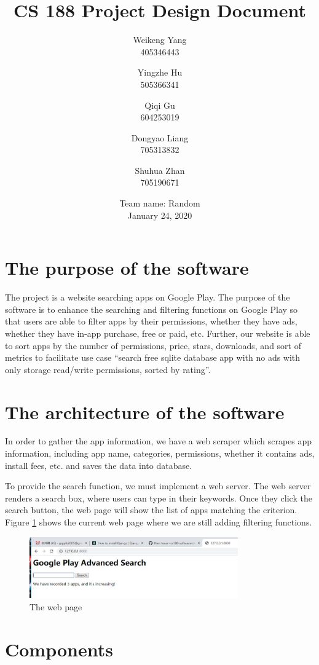 \documentclass[12pt, a4paper]{article}
\title{CS 188 Project Design Document}
\author{Weikeng Yang\\405346443 \and
Yingzhe Hu\\505366341 \and
Qiqi Gu\\604253019 \and
Dongyao Liang\\705313832 \and
Shuhua Zhan\\705190671}
\date{Team name: Random\\[2mm]January 24, 2020}
\begin{document}
\maketitle

\section{The purpose of the software}
The project is a website searching apps on Google Play. The purpose of the software is to enhance the searching and filtering functions on Google Play so that users are able to filter apps by their permissions, whether they have ads, whether they have in-app purchase, free or paid, etc. Further, our website is able to sort apps by the number of permissions, price, stars, downloads, and sort of metrics to facilitate use case “search free sqlite database app with no ads with only storage read/write permissions, sorted by rating”.

\section{The architecture of the software}
In order to gather the app information, we have a web scraper which scrapes app information, including app name, categories, permissions, whether it contains ads, install fees, etc. and saves the data into database. 

To provide the search function, we must implement a web server. The web server renders a search box, where users can type in their keywords. Once they click the search button, the web page will show the list of apps matching the criterion. Figure \ref{fig:search-interface} shows the current web page where we are still adding filtering functions.

\begin{figure}[ht]
\centering
\includegraphics[width=0.8\textwidth]{search-interface.jpg}
\caption{The web page}
\label{fig:search-interface}
\end{figure}

\section{Components}
\end{document}

